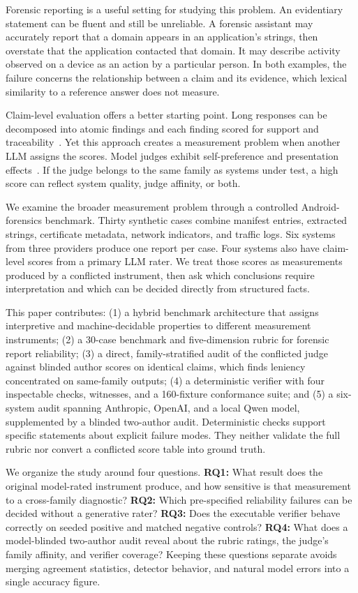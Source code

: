 \documentclass[conference]{IEEEtran}
\begin{document}
Forensic reporting is a useful setting for studying this problem. An evidentiary
statement can be fluent and still be unreliable. A forensic assistant may
accurately report that a domain appears in an application's strings, then
overstate that the application contacted that domain. It may describe activity
observed on a device as an action by a particular person. In both examples, the
failure concerns the relationship between a claim and its evidence, which
lexical similarity to a reference answer does not measure.

Claim-level evaluation offers a better starting point. Long responses can be
decomposed into atomic findings and each finding scored for support and
traceability~\cite{factscore,safe}. Yet this approach creates a measurement
problem when another LLM assigns the scores. Model judges exhibit self-preference
and presentation effects~\cite{panickssery2024,zheng2023}. If the judge belongs
to the same family as systems under test, a high score can reflect system
quality, judge affinity, or both.

We examine the broader measurement problem through a controlled
Android-forensics benchmark. Thirty synthetic cases combine manifest entries,
extracted strings, certificate metadata, network indicators, and traffic logs.
Six systems from three providers produce one report per case. Four systems also
have claim-level scores from a primary LLM rater. We treat those scores as
measurements produced by a conflicted instrument, then ask which conclusions
require interpretation and which can be decided directly from structured facts.

This paper contributes: (1) a hybrid benchmark architecture that assigns
interpretive and machine-decidable properties to different measurement
instruments; (2) a 30-case benchmark and five-dimension rubric for forensic
report reliability; (3) a direct, family-stratified audit of the conflicted
judge against blinded author scores on identical claims, which finds leniency
concentrated on same-family outputs; (4) a deterministic verifier with four inspectable checks, witnesses,
  and a 160-fixture conformance suite; and (5) a six-system audit spanning
  Anthropic, OpenAI, and a local Qwen model, supplemented by a blinded two-author
  audit. Deterministic checks support specific
statements about explicit failure modes. They neither validate the full rubric
nor convert a conflicted score table into ground truth.

We organize the study around four questions. \textbf{RQ1:} What result does the
original model-rated instrument produce, and how sensitive is that measurement
to a cross-family diagnostic? \textbf{RQ2:} Which pre-specified reliability
failures can be decided without a generative rater? \textbf{RQ3:} Does the
executable verifier behave correctly on seeded positive and matched negative
controls? \textbf{RQ4:} What does a model-blinded two-author audit reveal about
the rubric ratings, the judge's family affinity, and verifier coverage? Keeping
these questions separate avoids merging agreement statistics, detector behavior,
and natural model errors into a single accuracy figure.
\end{document}
